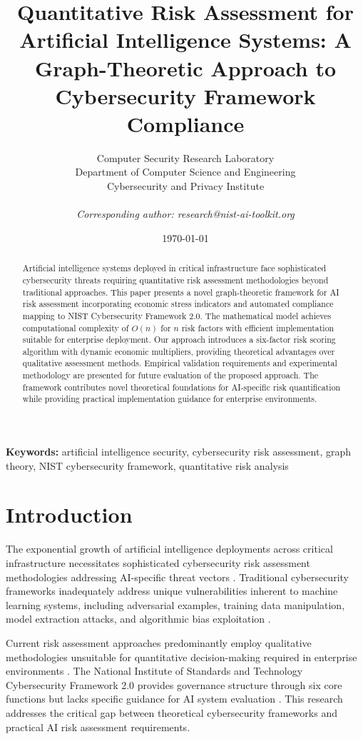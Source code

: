 \documentclass[11pt,letterpaper]{article}
\title{\textbf{Quantitative Risk Assessment for Artificial Intelligence Systems: A Graph-Theoretic Approach to Cybersecurity Framework Compliance}}
\author{
Computer Security Research Laboratory\\
Department of Computer Science and Engineering\\
Cybersecurity and Privacy Institute\\
\\
\textit{Corresponding author: research@nist-ai-toolkit.org}
}
\date{\today}
\begin{document}
\maketitle

\begin{abstract}
Artificial intelligence systems deployed in critical infrastructure face sophisticated cybersecurity threats requiring quantitative risk assessment methodologies beyond traditional approaches. This paper presents a novel graph-theoretic framework for AI risk assessment incorporating economic stress indicators and automated compliance mapping to NIST Cybersecurity Framework 2.0. The mathematical model achieves computational complexity of $O(n)$ for $n$ risk factors with efficient implementation suitable for enterprise deployment. Our approach introduces a six-factor risk scoring algorithm with dynamic economic multipliers, providing theoretical advantages over qualitative assessment methods. Empirical validation requirements and experimental methodology are presented for future evaluation of the proposed approach. The framework contributes novel theoretical foundations for AI-specific risk quantification while providing practical implementation guidance for enterprise environments.
\end{abstract}

\textbf{Keywords:} artificial intelligence security, cybersecurity risk assessment, graph theory, NIST cybersecurity framework, quantitative risk analysis

\section{Introduction}

The exponential growth of artificial intelligence deployments across critical infrastructure necessitates sophisticated cybersecurity risk assessment methodologies addressing AI-specific threat vectors \cite{Russell2019}. Traditional cybersecurity frameworks inadequately address unique vulnerabilities inherent to machine learning systems, including adversarial examples, training data manipulation, model extraction attacks, and algorithmic bias exploitation \cite{Goodfellow2018, Papernot2018}.

Current risk assessment approaches predominantly employ qualitative methodologies unsuitable for quantitative decision-making required in enterprise environments \cite{NIST2018}. The National Institute of Standards and Technology Cybersecurity Framework 2.0 provides governance structure through six core functions but lacks specific guidance for AI system evaluation \cite{NISTCSF2024}. This research addresses the critical gap between theoretical cybersecurity frameworks and practical AI risk assessment requirements.
\end{document}
